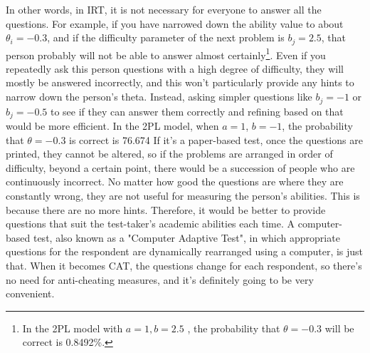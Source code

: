 \documentclass{ltjsbook}
\begin{document}
In other words, in IRT, it is not necessary for everyone to answer all the questions. For example, if you have narrowed down the ability value to about $\theta_i = -0.3$, and if the difficulty parameter of the next problem is $b_j = 2.5$, that person probably will not be able to answer almost certainly\footnote{In the 2PL model with $a=1, b=2.5$ , the probability that $\theta=-0.3$ will be correct is 0.8492\%.}.
Even if you repeatedly ask this person questions with a high degree of difficulty, they will mostly be answered incorrectly, and this won't particularly provide any hints to narrow down the person's theta. Instead, asking simpler questions like $b_j=-1$ or $b_j=-0.5$ to see if they can answer them correctly and refining based on that would be more efficient. In the 2PL model, when $a=1$, $b=-1$, the probability that $\theta=-0.3$ is correct is 76.674%
If it's a paper-based test, once the questions are printed, they cannot be altered, so if the problems are arranged in order of difficulty, beyond a certain point, there would be a succession of people who are continuously incorrect. No matter how good the questions are where they are constantly wrong, they are not useful for measuring the person's abilities. This is because there are no more hints. Therefore, it would be better to provide questions that suit the test-taker's academic abilities each time. A computer-based test, also known as a "Computer Adaptive Test", in which appropriate questions for the respondent are dynamically rearranged using a computer, is just that.
When it becomes CAT, the questions change for each respondent, so there's no need for anti-cheating measures, and it's definitely going to be very convenient.
\end{document}

